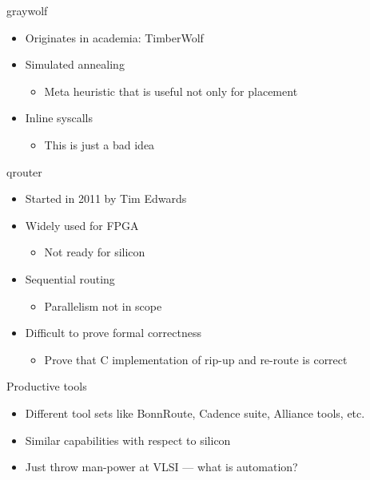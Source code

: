 \documentclass[aspectratio=169]{beamer}
\begin{document}
\begin{frame}{graywolf}
	\begin{itemize}
        \setlength\itemsep{1em}
		\item Originates in academia: TimberWolf
		\item Simulated annealing
	        \begin{itemize}
		    \item Meta heuristic that is useful not only for placement
	        \end{itemize}
		\item Inline syscalls
	        \begin{itemize}
		    \item This is just a bad idea
	        \end{itemize}
	\end{itemize}
\end{frame}

\begin{frame}{qrouter}
	\begin{itemize}
        \setlength\itemsep{1em}
		\item Started in 2011 by Tim Edwards 
		\item Widely used for FPGA
	        \begin{itemize}
		    \item Not ready for silicon
	        \end{itemize}
		\item Sequential routing
	        \begin{itemize}
		    \item Parallelism not in scope
	        \end{itemize}
		\item Difficult to prove formal correctness
	        \begin{itemize}
		    \item Prove that C implementation of rip-up and re-route is correct
	        \end{itemize}
	\end{itemize}
\end{frame}

\begin{frame}{Productive tools}
	\begin{itemize}
        \setlength\itemsep{1em}
		\item Different tool sets like BonnRoute, Cadence suite, Alliance tools, etc.
		\item Similar capabilities with respect to silicon
		\item Just throw man-power at VLSI --- what is automation?
	\end{itemize}
\end{frame}
\end{document}
